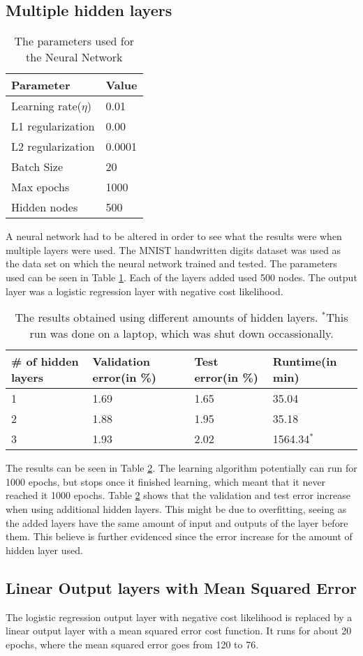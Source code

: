 
\subsection*{Multiple hidden layers}

\begin{table}[!h]
\centering
\begin{tabular}{ll}
\textbf{Parameter}           & \textbf{Value} \\ \hline  
Learning rate($\eta$) & 0.01   \\
L1 regularization   & 0.00   \\
L2 regularization   & 0.0001 \\
Batch Size          & 20     \\
Max epochs          & 1000   \\
Hidden nodes        & 500   
\end{tabular}
\caption{The parameters used for the Neural Network}
\label{parameters1}
\end{table}

A neural network had to be altered in order to see what the results were when multiple layers were used. The MNIST handwritten digits dataset was used as the data set on which the neural network trained and tested. The parameters used can be seen in Table \ref{parameters1}. Each of the layers added used 500 nodes. The output layer was a logistic regression layer with negative cost likelihood.

\begin{table}[!h]
\centering
\begin{tabular}{llll}
\textbf{\# of hidden layers} & \textbf{Validation error(in \%)} & \textbf{Test error(in \%)} & \textbf{Runtime(in min)} \\ \hline
1       &      1.69   &           1.65    & 35.04              \\
2       &      1.88                     &       1.95    &      35.18       \\
3        &       1.93                    &      2.02    &    1564.34$^{*}$       

\end{tabular}
\caption{The results obtained using different amounts of hidden layers. $^*$This run was done on a laptop, which was shut down occassionally.}
\label{results1}
\end{table}

The results can be seen in Table \ref{results1}. The learning algorithm potentially can run for 1000 epochs, but stops once it finished learning, which meant that it never reached it 1000 epochs. Table \ref{results1} shows that the validation and test error increase when using additional hidden layers. This might be due to overfitting, seeing as the added layers have the same amount of input and outputs of the layer before them. This believe is further evidenced since the error increase for the amount of hidden layer used.

\subsection*{Linear Output layers with Mean Squared Error}

The logistic regression output layer with negative cost likelihood is replaced by a linear output layer with a mean squared error cost function. It runs for about 20 epochs, where the mean squared error goes from 120 to 76.